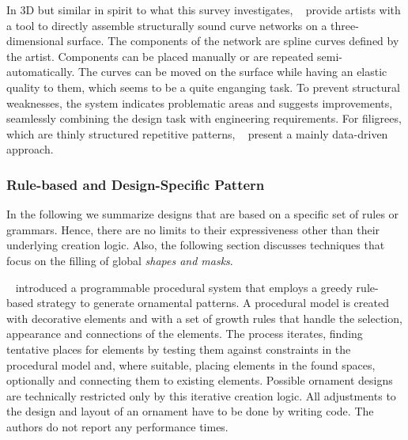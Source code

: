 In 3D but similar in spirit to what this survey investigates, \citeauthor*{zehnder_2016_dso}~\cite{zehnder_2016_dso} provide artists with a tool to directly assemble structurally sound curve networks on a three-dimensional surface. The components of the network are spline curves defined by the artist. Components can be placed manually or are repeated semi-automatically. The curves can be moved on the surface while having an elastic quality to them, which seems to be a quite enganging task. To prevent structural weaknesses, the system indicates problematic areas and suggests improvements, seamlessly combining the design task with engineering requirements. For filigrees, which are thinly structured repetitive patterns, \citeauthor*{chen_2016_sof}~\cite{chen_2016_sof} present a mainly data-driven approach. 




\subsubsection{Rule-based and Design-Specific Pattern}
\label{subsubsec:analysis_rulebased_and_designspecific}

In the following we summarize designs that are based on a specific set of rules or grammars. Hence, there are no limits to their expressiveness other than their underlying creation logic. Also, the following section discusses techniques that focus on the filling of global \textit{shapes and masks}.

\citeauthor*{wong_1998_cgf}~\cite{wong_1998_cgf} introduced a programmable procedural system that employs a greedy rule-based strategy to generate ornamental patterns. A procedural model is created with decorative elements and with a set of growth rules that handle the selection, appearance and connections of the elements. The process iterates, finding tentative places for elements by testing them against constraints in the procedural model and, where suitable, placing elements in the found spaces, optionally and connecting them to existing elements. Possible ornament designs are technically restricted only by this iterative creation logic. All adjustments to the design and layout of an ornament have to be done by writing code. The authors do not report any performance times.

